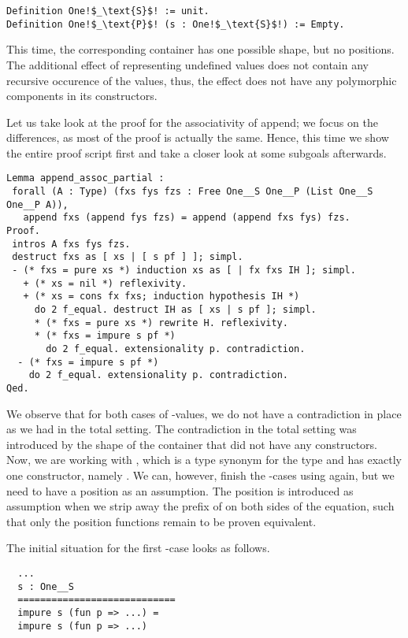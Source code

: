 \begin{verbatim}
Definition One!$_\text{S}$! := unit.
Definition One!$_\text{P}$! (s : One!$_\text{S}$!) := Empty.
\end{verbatim}

This time, the corresponding container has one possible shape, but no positions.
The additional effect of representing undefined values does not contain any recursive occurence of the  values, thus, the effect does not have any polymorphic components in its constructors.

Let us take look at the proof for the associativity of append; we focus on the differences, as most of the proof is actually the same.
Hence, this time we show the entire proof script first and take a closer look at some subgoals afterwards.

\begin{verbatim}
Lemma append_assoc_partial :
 forall (A : Type) (fxs fys fzs : Free One__S One__P (List One__S One__P A)),
   append fxs (append fys fzs) = append (append fxs fys) fzs.
Proof.
 intros A fxs fys fzs.
 destruct fxs as [ xs | [ s pf ] ]; simpl.
 - (* fxs = pure xs *) induction xs as [ | fx fxs IH ]; simpl.
   + (* xs = nil *) reflexivity.
   + (* xs = cons fx fxs; induction hypothesis IH *)
     do 2 f_equal. destruct IH as [ xs | s pf ]; simpl.
     * (* fxs = pure xs *) rewrite H. reflexivity.
     * (* fxs = impure s pf *)
       do 2 f_equal. extensionality p. contradiction.
  - (* fxs = impure s pf *)
    do 2 f_equal. extensionality p. contradiction.
Qed.
\end{verbatim}

We observe that for both cases of -values, we do not have a contradiction in place as we had in the total setting.
The contradiction in the total setting was introduced by the shape of the container that did not have any constructors.
Now, we are working with , which is a type synonym for the  type and has exactly one constructor, namely .
We can, however, finish the -cases using  again, but we need to have a position as an
assumption.
The position is introduced as assumption when we strip away the prefix of  on both sides of the equation, such that only the position functions  remain to be proven equivalent.

The initial situation for the first -case looks as follows.

\begin{verbatim}
  ...
  s : One__S
  ============================
  impure s (fun p => ...) =
  impure s (fun p => ...)
\end{verbatim}

